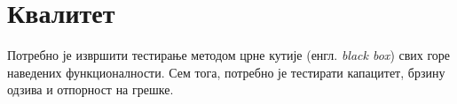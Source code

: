 \section{Квалитет}

Потребно је извршити тестирање методом црне кутије (енгл. \textit{black box}) свих горе
наведених функционалности. Сем тога, потребно је тестирати капацитет, брзину одзива и
отпорност на грешке.